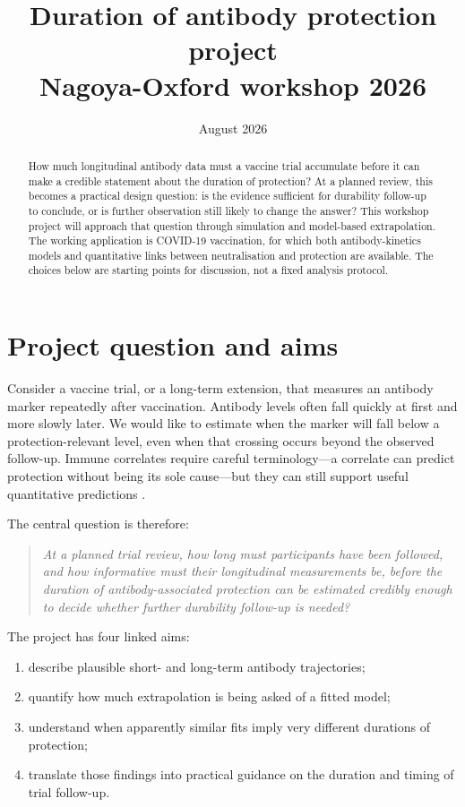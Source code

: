 \documentclass[11pt,a4paper]{article}
\title{\textbf{Duration of antibody protection project}\\[0.35em]
       \large Nagoya-Oxford workshop 2026}
\author{}
\date{August 2026}
\begin{document}
\maketitle
\vspace{-2.2em}

\begin{abstract}
How much longitudinal antibody data must a vaccine trial accumulate before it can make a credible
statement about the duration of protection? At a planned review, this becomes a practical design
question: is the evidence sufficient for durability follow-up to conclude, or is further observation
still likely to change the answer? This workshop project will approach that question through
simulation and model-based extrapolation. The working application is COVID-19 vaccination, for
which both antibody-kinetics models and quantitative links between neutralisation and protection
are available. The choices below are starting points for discussion, not a fixed analysis protocol.
\end{abstract}

\section{Project question and aims}\label{sec:aims}

Consider a vaccine trial, or a long-term extension, that measures an antibody marker repeatedly
after vaccination. Antibody levels often fall quickly at first and more slowly later. We would like
to estimate when the marker will fall below a protection-relevant level, even when that crossing
occurs beyond the observed follow-up. Immune correlates require careful terminology---a correlate
can predict protection without being its sole cause---but they can still support useful quantitative
predictions \parencite{plotkin2012,earle2021}.

The central question is therefore:

\begin{quote}
\emph{At a planned trial review, how long must participants have been followed, and how informative
must their longitudinal measurements be, before the duration of antibody-associated protection can
be estimated credibly enough to decide whether further durability follow-up is needed?}
\end{quote}

The project has four linked aims:
\begin{enumerate}
  \item describe plausible short- and long-term antibody trajectories;
  \item quantify how much extrapolation is being asked of a fitted model;
  \item understand when apparently similar fits imply very different durations of protection;
  \item translate those findings into practical guidance on the duration and timing of trial
        follow-up.
\end{enumerate}
\end{document}
